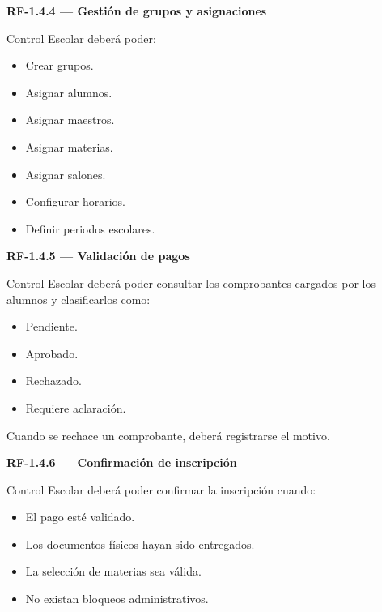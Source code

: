 \documentclass[12pt,a4paper]{article}
\newcommand{\RF}[1]{\textbf{\color{primary}RF-#1}}
\newenvironment{requisito}[1]
{
\begin{center}
\begin{minipage}{0.96\textwidth}
\colorbox{requirement}{
\begin{minipage}{0.94\textwidth}
\textbf{#1}
\end{minipage}
}
\vspace{2mm}
}
{
\end{minipage}
\end{center}
}
\begin{document}
\begin{requisito}{\RF{1.4.4} --- Gestión de grupos y asignaciones}
Control Escolar deberá poder:

\begin{itemize}[leftmargin=*]
\item Crear grupos.
\item Asignar alumnos.
\item Asignar maestros.
\item Asignar materias.
\item Asignar salones.
\item Configurar horarios.
\item Definir periodos escolares.
\end{itemize}
\end{requisito}

\begin{requisito}{\RF{1.4.5} --- Validación de pagos}
Control Escolar deberá poder consultar los comprobantes cargados por los alumnos
y clasificarlos como:

\begin{itemize}[leftmargin=*]
\item Pendiente.
\item Aprobado.
\item Rechazado.
\item Requiere aclaración.
\end{itemize}

Cuando se rechace un comprobante, deberá registrarse el motivo.
\end{requisito}

\begin{requisito}{\RF{1.4.6} --- Confirmación de inscripción}
Control Escolar deberá poder confirmar la inscripción cuando:

\begin{itemize}[leftmargin=*]
\item El pago esté validado.
\item Los documentos físicos hayan sido entregados.
\item La selección de materias sea válida.
\item No existan bloqueos administrativos.
\end{itemize}
\end{requisito}
\end{document}
